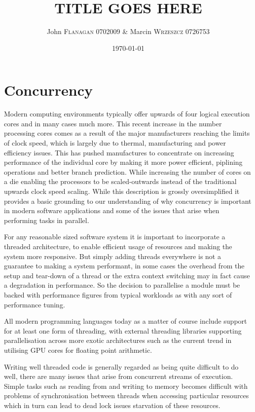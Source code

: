 \documentclass[pdftex,11pt,a4paper]{article}
\author{John \textsc{Flanagan} 0702009 \& Marcin \textsc{Wrzeszcz} 0726753 }
\title{TITLE GOES HERE}
\date{\today}
\begin{document}



\pagebreak

\tableofcontents
\pagebreak

\section{Concurrency}
Modern computing environments typically offer upwards of four logical execution cores and in many cases much more. This recent increase in the number processing cores comes as a result of the major manufacturers reaching the limits of clock speed, which is largely due to thermal, manufacturing and power efficiency issues. This has pushed manufactures to concentrate on increasing performance of the individual core by making it more power efficient, piplining operations and better branch prediction. While increasing the number of cores on a die enabling the processors to be scaled-outwards instead of the traditional upwards clock speed scaling. While this description is grossly oversimplified it provides a basic grounding to our understanding of why concurrency is important in modern software applications and some of the issues that arise when performing tasks in parallel. 

For any reasonable sized software system it is important to incorporate a threaded architecture, to enable efficient usage of resources and making the system more responsive. But simply adding threads everywhere is not a guarantee to making a system performant, in some cases the overhead from the setup and tear-down of a thread or the extra context switching may in fact cause a degradation in performance. So the decision to parallelise a module must be backed with performance figures from typical workloads as with any sort of performance tuning.

All modern programming languages today as a matter of course include support for at least one form of threading, with external threading libraries supporting parallelisation across more exotic architectures such as the current trend in utilising GPU cores for floating point arithmetic. 

Writing well threaded code is generally regarded as being quite difficult to do well, there are many issues that arise from concurrent streams of execution. Simple tasks such as reading from and writing to memory becomes difficult with problems of synchronisation between threads when accessing particular resources which in turn can lead to dead lock issues starvation of these resources.
\end{document}
